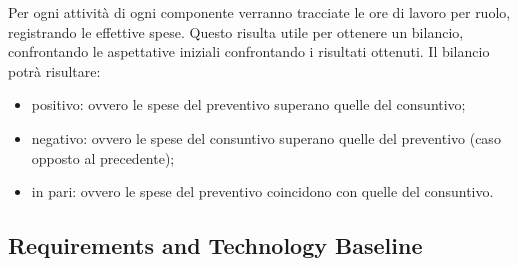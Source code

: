 Per ogni attività di ogni componente verranno tracciate le ore di lavoro per ruolo, registrando 
le effettive spese. Questo risulta utile per ottenere un bilancio, confrontando le aspettative iniziali confrontando
i risultati ottenuti. Il bilancio potrà risultare:
\begin{itemize}
    \item positivo: ovvero le spese del preventivo superano quelle del consuntivo;
    \item negativo: ovvero le spese del consuntivo superano quelle del preventivo (caso opposto al precedente);
    \item in pari: ovvero le spese del preventivo coincidono con quelle del consuntivo.
\end{itemize}

\subsection{Requirements and Technology Baseline} 
